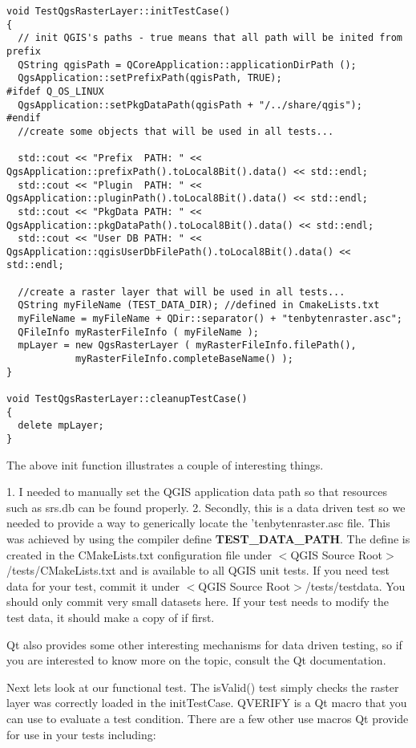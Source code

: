\begin{verbatim}
void TestQgsRasterLayer::initTestCase()
{
  // init QGIS's paths - true means that all path will be inited from prefix
  QString qgisPath = QCoreApplication::applicationDirPath ();
  QgsApplication::setPrefixPath(qgisPath, TRUE);
#ifdef Q_OS_LINUX
  QgsApplication::setPkgDataPath(qgisPath + "/../share/qgis");
#endif
  //create some objects that will be used in all tests...

  std::cout << "Prefix  PATH: " << QgsApplication::prefixPath().toLocal8Bit().data() << std::endl;
  std::cout << "Plugin  PATH: " << QgsApplication::pluginPath().toLocal8Bit().data() << std::endl;
  std::cout << "PkgData PATH: " << QgsApplication::pkgDataPath().toLocal8Bit().data() << std::endl;
  std::cout << "User DB PATH: " << QgsApplication::qgisUserDbFilePath().toLocal8Bit().data() << std::endl;

  //create a raster layer that will be used in all tests...
  QString myFileName (TEST_DATA_DIR); //defined in CmakeLists.txt
  myFileName = myFileName + QDir::separator() + "tenbytenraster.asc";
  QFileInfo myRasterFileInfo ( myFileName );
  mpLayer = new QgsRasterLayer ( myRasterFileInfo.filePath(),
            myRasterFileInfo.completeBaseName() );
}

void TestQgsRasterLayer::cleanupTestCase()
{
  delete mpLayer;
}

\end{verbatim}

The above init function illustrates a couple of interesting things.

 1. I needed to manually set the QGIS application data path so that
   resources such as srs.db can be found properly.
 2. Secondly, this is a data driven test so we needed to provide a 
   way to generically locate the 'tenbytenraster.asc file. This was 
   achieved by using the compiler define \textbf{TEST\_DATA\_PATH}. The 
   define is created in the CMakeLists.txt configuration file under 
   $<$QGIS Source Root$>$/tests/CMakeLists.txt and is available to all 
   QGIS unit tests. If you need test data for your test, commit it 
   under $<$QGIS Source Root$>$/tests/testdata. You should only commit 
   very small datasets here. If your test needs to modify the test 
   data, it should make a copy of if first.

Qt also provides some other interesting mechanisms for data driven 
testing, so if you are interested to know more on the topic, consult 
the Qt documentation.

Next lets look at our functional test. The isValid() test simply checks the
raster layer was correctly loaded in the initTestCase.  QVERIFY is a Qt macro
that you can use to evaluate a test condition.  There are a few other use
macros Qt provide for use in your tests including:

